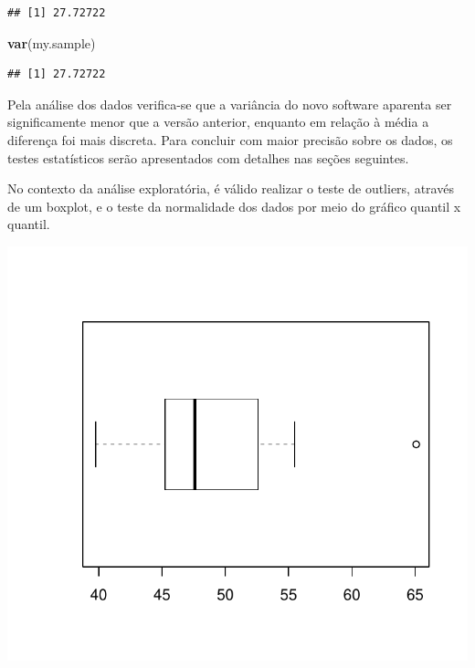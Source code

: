 \documentclass[]{article}
\newenvironment{Shaded}{\begin{snugshade}}{\end{snugshade}}
\newcommand{\KeywordTok}[1]{\textcolor[rgb]{0.13,0.29,0.53}{\textbf{#1}}}
\newcommand{\NormalTok}[1]{#1}
\begin{document}
\begin{verbatim}
## [1] 27.72722
\end{verbatim}

\begin{Shaded}
\begin{Highlighting}[]
\KeywordTok{var}\NormalTok{(my.sample)}
\end{Highlighting}
\end{Shaded}

\begin{verbatim}
## [1] 27.72722
\end{verbatim}

Pela análise dos dados verifica-se que a variância do novo software
aparenta ser significamente menor que a versão anterior, enquanto em
relação à média a diferença foi mais discreta. Para concluir com maior
precisão sobre os dados, os testes estatísticos serão apresentados com
detalhes nas seções seguintes.

No contexto da análise exploratória, é válido realizar o teste de
outliers, através de um boxplot, e o teste da normalidade dos dados por
meio do gráfico quantil x quantil.

\includegraphics{CS01report_maressa_files/figure-latex/plot-1.pdf}
\end{document}
